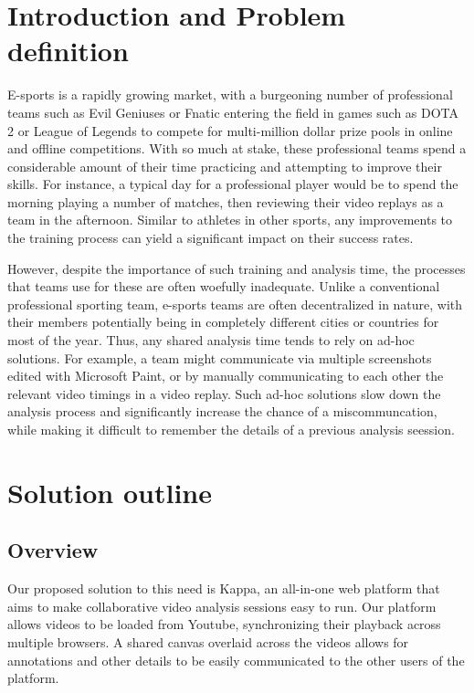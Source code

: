 \documentclass[conference]{IEEEtran}
\begin{document}
\section{Introduction and Problem definition}

  E-sports is a rapidly growing market, with a burgeoning number of professional teams such as Evil Geniuses or Fnatic entering the field in games such as DOTA 2 or League of Legends to compete for multi-million dollar prize pools in online and offline competitions. With so much at stake, these professional teams spend a considerable amount of their time practicing and attempting to improve their skills. For instance, a typical day for a professional player would be to spend the morning playing a number of matches, then reviewing their video replays as a team in the afternoon. Similar to athletes in other sports, any improvements to the training process can yield a significant impact on their success rates.

  However, despite the importance of such training and analysis time, the processes that teams use for these are often woefully inadequate. Unlike a conventional professional sporting team, e-sports teams are often decentralized in nature, with their members potentially being in completely different cities or countries for most of the year. Thus, any shared analysis time tends to rely on ad-hoc solutions. For example, a team might communicate via multiple screenshots edited with Microsoft Paint, or by manually communicating to each other the relevant video timings in a video replay. Such ad-hoc solutions slow down the analysis process and significantly increase the chance of a miscommuncation, while making it difficult to remember the details of a previous analysis seession.

\section{Solution outline}

\subsection{Overview}

  Our proposed solution to this need is Kappa, an all-in-one web platform that aims to make collaborative video analysis sessions easy to run. Our platform allows videos to be loaded from Youtube, synchronizing their playback across multiple browsers. A shared canvas overlaid across the videos allows for annotations and other details to be easily communicated to the other users of the platform.
\end{document}
